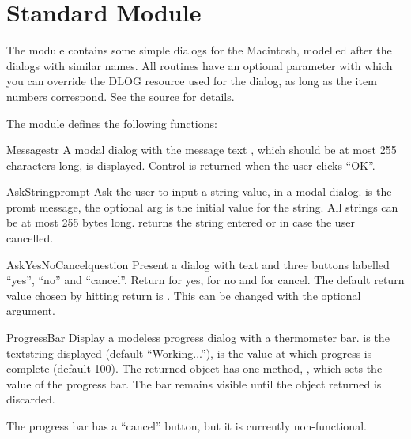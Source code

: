\section{Standard Module }
\label{module-EasyDialogs}

The  module contains some simple dialogs for
the Macintosh, modelled after the  dialogs with similar
names. All routines have an optional parameter  with which you
can override the DLOG resource used for the dialog, as long as the
item numbers correspond. See the source for details.

The  module defines the following functions:

\renewcommand{\indexsubitem}{(in module EasyDialogs)}

\begin{funcdesc}{Message}{str}
A modal dialog with the message text , which should be at
most 255 characters long, is displayed. Control is returned when the
user clicks ``OK''.
\end{funcdesc}

\begin{funcdesc}{AskString}{prompt}
Ask the user to input a string value, in a modal dialog. 
is the promt message, the optional  arg is the initial
value for the string. All strings can be at most 255 bytes
long.  returns the string entered or  in
case the user cancelled.
\end{funcdesc}

\begin{funcdesc}{AskYesNoCancel}{question}
Present a dialog with text  and three buttons labelled
``yes'', ``no'' and ``cancel''. Return  for yes,  for
no and  for cancel. The default return value chosen by
hitting return is . This can be changed with the optional
 argument.
\end{funcdesc}

\begin{funcdesc}{ProgressBar}{}
Display a modeless progress dialog with a thermometer bar. 
is the textstring displayed (default ``Working...''),  is
the value at which progress is complete (default 100). The returned
object has one method, , which sets the value of the
progress bar. The bar remains visible until the object returned is
discarded.

The progress bar has a ``cancel'' button, but it is currently
non-functional.
\end{funcdesc}


